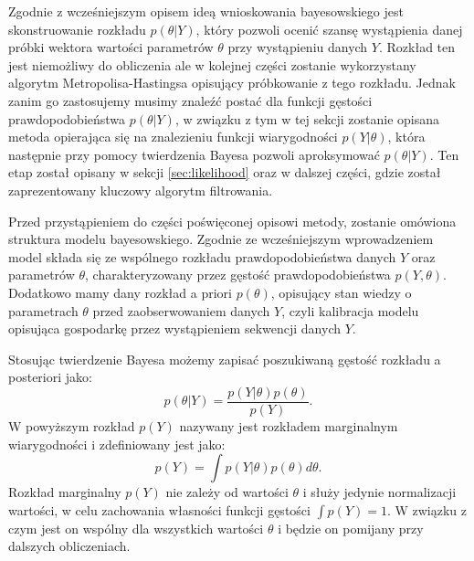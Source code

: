 Zgodnie z wcześniejszym opisem ideą wnioskowania bayesowskiego jest skonstruowanie rozkładu $p(\theta|Y)$, który pozwoli ocenić szansę wystąpienia danej próbki wektora wartości parametrów $\theta$ przy wystąpieniu danych $Y$. Rozkład ten jest niemożliwy do obliczenia ale w kolejnej części zostanie wykorzystany algorytm Metropolisa-Hastingsa opisujący próbkowanie z tego rozkładu. Jednak zanim go zastosujemy musimy znaleźć postać dla funkcji gęstości prawdopodobieństwa $p(\theta|Y)$, w związku z tym w tej sekcji zostanie opisana metoda opierająca się na znalezieniu funkcji wiarygodności $p(Y|\theta)$, która następnie przy pomocy twierdzenia Bayesa pozwoli aproksymować $p(\theta|Y)$. Ten etap został opisany w sekcji \ref{sec:likelihood} oraz w dalszej części, gdzie został zaprezentowany kluczowy algorytm filtrowania.

Przed przystąpieniem do części poświęconej opisowi metody, zostanie omówiona struktura modelu bayesowskiego. Zgodnie ze wcześniejszym wprowadzeniem model składa się ze wspólnego rozkładu prawdopodobieństwa danych $Y$ oraz parametrów $\theta$, charakteryzowany przez gęstość prawdopodobieństwa $p(Y, \theta)$. Dodatkowo mamy dany rozkład a priori $p(\theta)$, opisujący stan wiedzy o parametrach $\theta$ przed zaobserwowaniem danych $Y$, czyli kalibracja modelu opisująca gospodarkę przez wystąpieniem sekwencji danych $Y$. 

Stosując twierdzenie Bayesa możemy zapisać poszukiwaną gęstość rozkładu a posteriori jako:
\begin{equation}
    p(\theta|Y) = \frac{p(Y|\theta)p(\theta)}{p(Y)}.
\end{equation}
W powyższym rozkład $p(Y)$ nazywany jest rozkładem marginalnym wiarygodności i zdefiniowany jest jako:
\begin{equation}
    p(Y) = \int p(Y|\theta)p(\theta)d\theta.
\end{equation}
Rozkład marginalny $p(Y)$ nie zależy od wartości $\theta$ i służy jedynie normalizacji wartości, w celu zachowania własności funkcji gęstości $\int p(Y) = 1$. W związku z czym jest on wspólny dla wszystkich wartości $\theta$ i będzie on pomijany przy dalszych obliczeniach.

